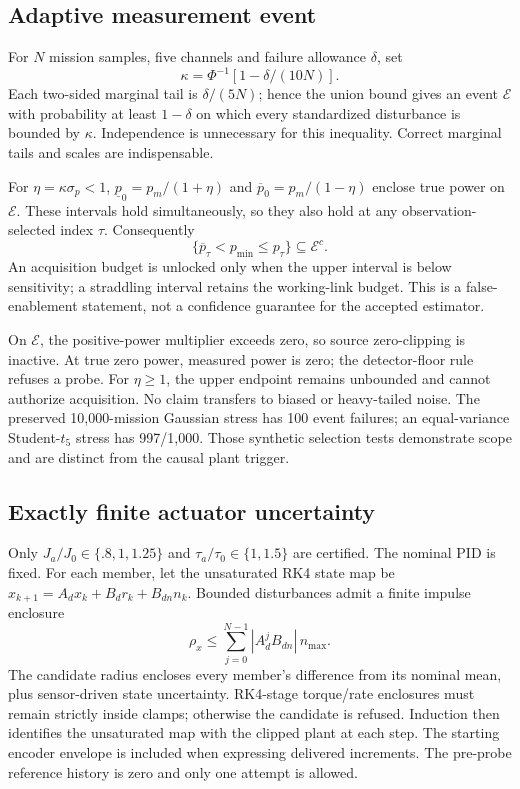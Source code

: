 \documentclass[10pt,journal]{IEEEtran}
\begin{document}
\subsection{Adaptive measurement event}
For $N$ mission samples, five channels and failure allowance $\delta$, set
\begin{equation}
\kappa=\Phi^{-1}[1-\delta/(10N)].
\end{equation}
Each two-sided marginal tail is $\delta/(5N)$; hence the union bound gives an event $\mathcal E$ with probability at least $1-\delta$ on which every standardized disturbance is bounded by $\kappa$. Independence is unnecessary for this inequality. Correct marginal tails and scales are indispensable.

For $\eta=\kappa\sigma_p<1$, $\underline p_0=p_m/(1+\eta)$ and $\overline p_0=p_m/(1-\eta)$ enclose true power on $\mathcal E$. These intervals hold simultaneously, so they also hold at any observation-selected index $\tau$. Consequently
\begin{equation}
\{\overline p_\tau<p_{\min}\leq p_\tau\}\subseteq\mathcal E^c.
\end{equation}
An acquisition budget is unlocked only when the upper interval is below sensitivity; a straddling interval retains the working-link budget. This is a false-enablement statement, not a confidence guarantee for the accepted estimator.

On $\mathcal E$, the positive-power multiplier exceeds zero, so source zero-clipping is inactive. At true zero power, measured power is zero; the detector-floor rule refuses a probe. For $\eta\geq1$, the upper endpoint remains unbounded and cannot authorize acquisition. No claim transfers to biased or heavy-tailed noise. The preserved 10,000-mission Gaussian stress has 100 event failures; an equal-variance Student-$t_5$ stress has 997/1,000. Those synthetic selection tests demonstrate scope and are distinct from the causal plant trigger.

\subsection{Exactly finite actuator uncertainty}
Only $J_a/J_0\in\{.8,1,1.25\}$ and $\tau_a/\tau_0\in\{1,1.5\}$ are certified. The nominal PID is fixed. For each member, let the unsaturated RK4 state map be $x_{k+1}=A_dx_k+B_dr_k+B_{dn}n_k$. Bounded disturbances admit a finite impulse enclosure
\begin{equation}
\rho_x\leq\sum_{j=0}^{N-1}|A_d^jB_{dn}|\,n_{\max}.
\end{equation}
The candidate radius encloses every member's difference from its nominal mean, plus sensor-driven state uncertainty. RK4-stage torque/rate enclosures must remain strictly inside clamps; otherwise the candidate is refused. Induction then identifies the unsaturated map with the clipped plant at each step. The starting encoder envelope is included when expressing delivered increments. The pre-probe reference history is zero and only one attempt is allowed.
\end{document}

